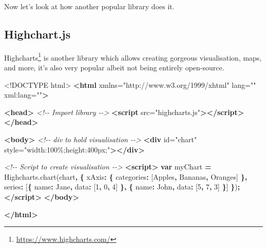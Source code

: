 \documentclass[
]{krantz}
\makeatletter
\newenvironment{Shaded}{\begin{snugshade}}{\end{snugshade}}
\newcommand{\AttributeTok}[1]{\textcolor[rgb]{0.61,0.61,0.61}{#1}}
\newcommand{\CommentTok}[1]{\textcolor[rgb]{0.37,0.37,0.37}{\textit{#1}}}
\newcommand{\DataTypeTok}[1]{\textcolor[rgb]{0.27,0.27,0.27}{#1}}
\newcommand{\DecValTok}[1]{\textcolor[rgb]{0.06,0.06,0.06}{#1}}
\newcommand{\KeywordTok}[1]{\textcolor[rgb]{0.27,0.27,0.27}{\textbf{#1}}}
\newcommand{\NormalTok}[1]{#1}
\newcommand{\OperatorTok}[1]{\textcolor[rgb]{0.43,0.43,0.43}{\textbf{#1}}}
\newcommand{\OtherTok}[1]{\textcolor[rgb]{0.37,0.37,0.37}{#1}}
\newcommand{\StringTok}[1]{\textcolor[rgb]{0.5,0.5,0.5}{#1}}
\newcommand{\VariableTok}[1]{\textcolor[rgb]{0,0,0}{#1}}
\renewcommand{\href}[2]{#2\footnote{\url{#1}}}
\newenvironment{kframe}{%
\medskip{}
\setlength{\fboxsep}{.8em}
 \def\at@end@of@kframe{}%
 \ifinner\ifhmode%
  \def\at@end@of@kframe{\end{minipage}}%
  \begin{minipage}{\columnwidth}%
 \fi\fi%
 \def\FrameCommand##1{\hskip\@totalleftmargin \hskip-\fboxsep
 \colorbox{shadecolor}{##1}\hskip-\fboxsep
     \hskip-\linewidth \hskip-\@totalleftmargin \hskip\columnwidth}%
 \MakeFramed {\advance\hsize-\width
   \@totalleftmargin\z@ \linewidth\hsize
   \@setminipage}}%
 {\par\unskip\endMakeFramed%
 \at@end@of@kframe}
\renewenvironment{Shaded}{\begin{kframe}}{\end{kframe}}
\makeatother
\begin{document}
Now let's look at how another popular library does it.

\hypertarget{highchart.js}{%
\subsection{Highchart.js}\label{highchart.js}}

\href{https://www.highcharts.com/}{Highcharts} is another library which allows creating gorgeous visualisation, maps, and more, it's also very popular albeit not being entirely open-source.

\begin{Shaded}
\begin{Highlighting}[]
\DataTypeTok{<!DOCTYPE }\NormalTok{html}\DataTypeTok{>}
\KeywordTok{<html}\OtherTok{ xmlns=}\StringTok{"http://www.w3.org/1999/xhtml"}\OtherTok{ lang=}\StringTok{""}\OtherTok{ xml:lang=}\StringTok{""}\KeywordTok{>}

\KeywordTok{<head>}
  \CommentTok{<!{-}{-} Import library {-}{-}>}
  \KeywordTok{<script}\OtherTok{ src=}\StringTok{"highcharts.js"}\KeywordTok{></script>}
\KeywordTok{</head>}

\KeywordTok{<body>}
  \CommentTok{<!{-}{-} div to hold visualisation {-}{-}>}
  \KeywordTok{<div}\OtherTok{ id=}\StringTok{"chart"}\OtherTok{ style=}\StringTok{"width:100\%;height:400px;"}\KeywordTok{></div>}

  \CommentTok{<!{-}{-} Script to create visualisation {-}{-}>}
  \KeywordTok{<script>}
    \KeywordTok{var}\NormalTok{ myChart }\OperatorTok{=} \VariableTok{Highcharts}\NormalTok{.}\AttributeTok{chart}\NormalTok{(}\StringTok{\textquotesingle{}chart\textquotesingle{}}\OperatorTok{,} \OperatorTok{\{}
        \DataTypeTok{xAxis}\OperatorTok{:} \OperatorTok{\{}
            \DataTypeTok{categories}\OperatorTok{:}\NormalTok{ [}\StringTok{\textquotesingle{}Apples\textquotesingle{}}\OperatorTok{,} \StringTok{\textquotesingle{}Bananas\textquotesingle{}}\OperatorTok{,} \StringTok{\textquotesingle{}Oranges\textquotesingle{}}\NormalTok{]}
        \OperatorTok{\},}
        \DataTypeTok{series}\OperatorTok{:}\NormalTok{ [}\OperatorTok{\{}
            \DataTypeTok{name}\OperatorTok{:} \StringTok{\textquotesingle{}Jane\textquotesingle{}}\OperatorTok{,}
            \DataTypeTok{data}\OperatorTok{:}\NormalTok{ [}\DecValTok{1}\OperatorTok{,} \DecValTok{0}\OperatorTok{,} \DecValTok{4}\NormalTok{]}
        \OperatorTok{\},} \OperatorTok{\{}
            \DataTypeTok{name}\OperatorTok{:} \StringTok{\textquotesingle{}John\textquotesingle{}}\OperatorTok{,}
            \DataTypeTok{data}\OperatorTok{:}\NormalTok{ [}\DecValTok{5}\OperatorTok{,} \DecValTok{7}\OperatorTok{,} \DecValTok{3}\NormalTok{]}
        \OperatorTok{\}}\NormalTok{]}
    \OperatorTok{\}}\NormalTok{)}\OperatorTok{;}
  \KeywordTok{</script>}
\KeywordTok{</body>}

\KeywordTok{</html>}
\end{Highlighting}
\end{Shaded}
\end{document}
